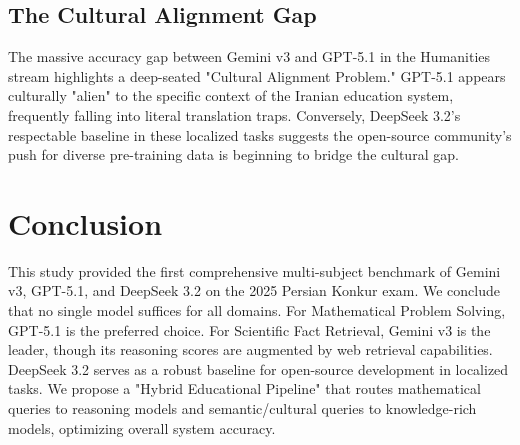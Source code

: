 \documentclass[twoside]{article}
\begin{document}
\subsection{The Cultural Alignment Gap}
The massive accuracy gap between Gemini v3 and GPT-5.1 in the Humanities stream highlights a deep-seated "Cultural Alignment Problem." GPT-5.1 appears culturally "alien" to the specific context of the Iranian education system, frequently falling into literal translation traps. Conversely, DeepSeek 3.2's respectable baseline in these localized tasks suggests the open-source community's push for diverse pre-training data is beginning to bridge the cultural gap.

\section{Conclusion}   
This study provided the first comprehensive multi-subject benchmark of Gemini v3, GPT-5.1, and DeepSeek 3.2 on the 2025 Persian Konkur exam. We conclude that no single model suffices for all domains. For Mathematical Problem Solving, GPT-5.1 is the preferred choice. For Scientific Fact Retrieval, Gemini v3 is the leader, though its reasoning scores are augmented by web retrieval capabilities. DeepSeek 3.2 serves as a robust baseline for open-source development in localized tasks. We propose a "Hybrid Educational Pipeline" that routes mathematical queries to reasoning models and semantic/cultural queries to knowledge-rich models, optimizing overall system accuracy.
\end{document}
